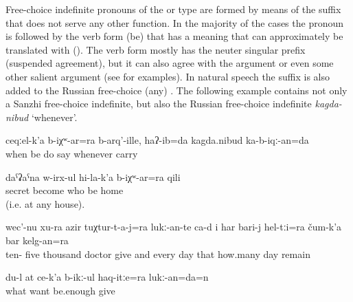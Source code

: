 Free-choice indefinite pronouns of the  or  type are formed by means of the suffix  that does not serve any other function. In the majority of the cases the pronoun is followed by the verb form  (be) that has a  meaning that can approximately be translated with  (). The verb form  mostly has the neuter singular prefix  (suspended agreement), but it can also agree with the  argument or even some other salient argument (see  for examples). In natural speech the suffix  is also added to the Russian free-choice   (any) . The following example  contains not only a Sanzhi free-choice indefinite, but also the Russian free-choice indefinite \textit{kagda-nibud} `whenever'.

\begin{exe}
	\ex	\label{ex:Whenever I make it, I will bring it, I said}
	\gll	ceqːel-k'a	b-iχʷ-ar=ra	b-arq'-ille,	haʔ-ib=da	kagda.nibud	ka-b-iqː-an=da\\
		when	be	do	say		whenever	carry\\
	\glt	{}

	\ex	\label{ex:He was hiding himself at the house of whomever. (at any house)}
	\gll	daˁʡaˁna	w-irx-ul	hi-la-k'a	b-iχʷ-ar=ra	qili\\
		secret	become	who	be	home\\
	\glt	{} (i.e. at any house).

	\ex	\label{ex:15000 needs to be given to the doctors and every day these (i.e. this amount of money), however many days you stay}
	\gll	wec'-nu	xu-ra	azir	tuχtur-t-a-j=ra	lukː-an-te	ca-d	i	har	bari-j	hel-tːi=ra	čum-k'a	bar	kelg-an=ra\\
		ten-	five	thousand doctor give 	and	every	day that	how.many day	remain\\
	\glt	{}

	\ex	\label{ex:I will give you whatever you can want}
	\gll	du-l	at	ce-k'a	b-ikː-ul	haq-itːe=ra	lukː-an=da=n\\
				what	want	be.enough	give\\
	\glt	{}
\end{exe}


